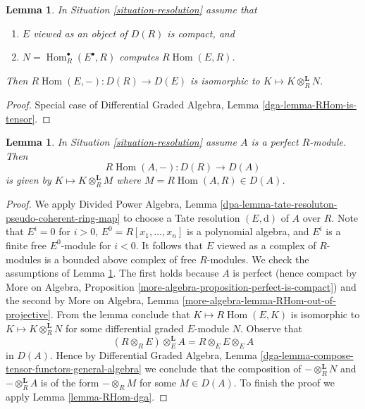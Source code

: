 \documentclass{stacks-project}
\theoremstyle{plain}
\newtheorem{lemma}[subsection]{Lemma}
\theoremstyle{definition}
\theoremstyle{remark}
\numberwithin{equation}{subsection}
\def\Hom{\mathop{\mathrm{Hom}}\nolimits}
\begin{document}
\begin{lemma}
\label{lemma-RHom-is-tensor}
In Situation \ref{situation-resolution} assume that
\begin{enumerate}
\item $E$ viewed as an object of $D(R)$ is compact, and
\item $N = \Hom^\bullet_R(E^\bullet, R)$ computes $R\Hom(E, R)$.
\end{enumerate}
Then $R\Hom(E, -) : D(R) \to D(E)$ is isomorphic to
$K \mapsto K \otimes_R^\mathbf{L} N$.
\end{lemma}

\begin{proof}
Special case of Differential Graded Algebra, Lemma
\ref{dga-lemma-RHom-is-tensor}.
\end{proof}

\begin{lemma}
\label{lemma-RHom-is-tensor-special}
In Situation \ref{situation-resolution} assume $A$ is a perfect $R$-module.
Then
$$
R\Hom(A, -) : D(R) \to D(A)
$$
is given by $K \mapsto K \otimes_R^\mathbf{L} M$
where $M = R\Hom(A, R) \in D(A)$.
\end{lemma}

\begin{proof}
We apply Divided Power Algebra, Lemma
\ref{dpa-lemma-tate-resoluton-pseudo-coherent-ring-map}
to choose a Tate resolution $(E, \text{d})$ of $A$ over $R$.
Note that $E^i = 0$ for $i > 0$, $E^0 = R[x_1, \ldots, x_n]$
is a polynomial algebra, and $E^i$ is a finite free $E^0$-module
for $i < 0$. It follows that $E$ viewed as a complex of $R$-modules
is a bounded above complex of free $R$-modules.
We check the assumptions of Lemma \ref{lemma-RHom-is-tensor}.
The first holds because $A$ is perfect
(hence compact by More on Algebra, Proposition
\ref{more-algebra-proposition-perfect-is-compact})
and the second by
More on Algebra, Lemma \ref{more-algebra-lemma-RHom-out-of-projective}.
From the lemma conclude that $K \mapsto R\Hom(E, K)$ is
isomorphic to $K \mapsto K \otimes_R^\mathbf{L} N$ for
some differential graded $E$-module $N$. Observe that
$$
(R \otimes_R E) \otimes_E^\mathbf{L} A = R \otimes_E E \otimes_E A
$$
in $D(A)$. Hence by Differential Graded Algebra, Lemma
\ref{dga-lemma-compose-tensor-functors-general-algebra}
we conclude that the composition of
$- \otimes_R^\mathbf{L} N$ and $- \otimes_R^\mathbf{L} A$
is of the form $- \otimes_R M$ for some $M \in D(A)$.
To finish the proof we apply Lemma \ref{lemma-RHom-dga}.
\end{proof}
\end{document}
